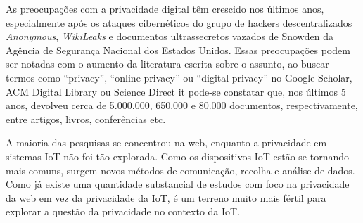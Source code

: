 \documentclass[conference]{IEEEtran}
\begin{document}

As preocupações com a privacidade digital têm crescido \cite{emami2019exploring, park2022personal, zhang2022peer}
nos últimos anos, especialmente após os ataques cibernéticos do grupo de
hackers descentralizados \textit{Anonymous}, \textit{WikiLeaks} e documentos ultrassecretos
vazados de Snowden da Agência de Segurança Nacional dos Estados Unidos.
Essas preocupações podem ser notadas com o aumento da literatura escrita
sobre o assunto, ao buscar termos como ``privacy'', ``online privacy'' ou
``digital privacy'' no Google Scholar, ACM Digital Library ou Science Direct
it pode-se constatar que, nos últimos 5 anos, devolveu cerca de 5.000.000,
650.000 e 80.000 documentos, respectivamente, entre artigos, livros,
conferências etc.


A maioria das pesquisas se concentrou na web, enquanto a privacidade em sistemas
IoT não foi tão explorada. Como os dispositivos IoT estão se tornando mais
comuns, surgem novos métodos de comunicação, recolha e análise de dados.
Como já existe uma quantidade substancial de estudos com foco na privacidade
da web em vez da privacidade da IoT, é um terreno muito mais fértil para explorar
a questão da privacidade no contexto da IoT.
\end{document}
